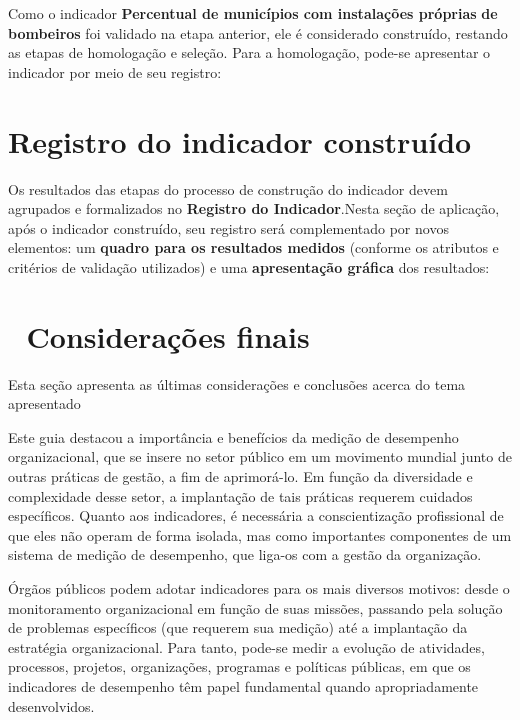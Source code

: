 \documentclass[
  letterpaper,
  DIV=11,
  numbers=noendperiod]{scrreprt}
\begin{document}
Como o indicador \textbf{Percentual de municípios com instalações
próprias} \textbf{de bombeiros} foi validado na etapa anterior, ele é
considerado construído, restando as etapas de homologação e seleção.
Para a homologação, pode-se apresentar o indicador por meio de seu
registro:

\hypertarget{registro-do-indicador-construuxeddo}{%
\chapter{Registro do indicador
construído}\label{registro-do-indicador-construuxeddo}}

Os resultados das etapas do processo de construção do indicador devem
agrupados e formalizados no \textbf{Registro do Indicador}.Nesta seção
de aplicação, após o indicador construído, seu registro será
complementado por novos elementos: um \textbf{quadro para os resultados
medidos} (conforme os atributos e critérios de validação utilizados) e
uma \textbf{apresentação gráfica} dos resultados:


\hypertarget{considerauxe7uxf5es-finais}{%
\chapter*{📝 Considerações finais}\label{considerauxe7uxf5es-finais}}


{Esta seção apresenta as últimas considerações e conclusões acerca do
tema apresentado}

Este guia destacou a importância e benefícios da medição de desempenho
organizacional, que se insere no setor público em um movimento mundial
junto de outras práticas de gestão, a fim de aprimorá-lo. Em função da
diversidade e complexidade desse setor, a implantação de tais práticas
requerem cuidados específicos. Quanto aos indicadores, é necessária a
conscientização profissional de que eles não operam de forma isolada,
mas como importantes componentes de um sistema de medição de desempenho,
que liga-os com a gestão da organização.

Órgãos públicos podem adotar indicadores para os mais diversos motivos:
desde o monitoramento organizacional em função de suas missões, passando
pela solução de problemas específicos (que requerem sua medição) até a
implantação da estratégia organizacional. Para tanto, pode-se medir a
evolução de atividades, processos, projetos, organizações, programas e
políticas públicas, em que os indicadores de desempenho têm papel
fundamental quando apropriadamente desenvolvidos.
\end{document}
